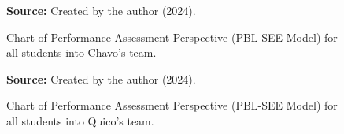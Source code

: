 \begin{figure}[ht!]
\centering

\caption{\textmd{Chart of Performance Assessment Perspective (\acrshort{PBL-SEE} Model) for all students into Chavo's team.}}
\label{fig:pbl-see_performance_in-chavos-team}

\par\medskip\ABNTEXfontereduzida\selectfont\textbf{Source:} Created by the author (2024).
\end{figure}

\begin{figure}[ht!]
\centering

\caption{\textmd{Chart of Performance Assessment Perspective (\acrshort{PBL-SEE} Model) for all students into Quico's team.}}
\label{fig:pbl-see_performance_in-quicos-team}

\par\medskip\ABNTEXfontereduzida\selectfont\textbf{Source:} Created by the author (2024).
\end{figure}

